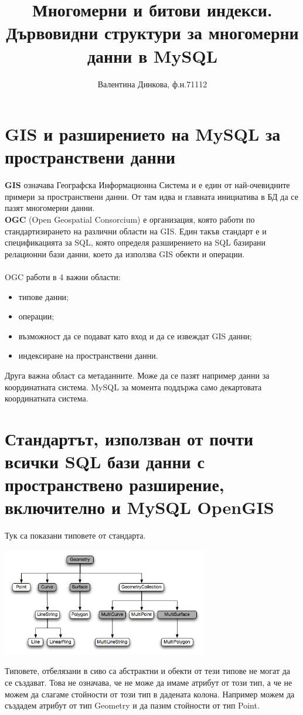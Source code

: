 \documentclass[a4paper,10pt]{article}
\title{Многомерни и битови индекси. Дървовидни структури за многомерни данни в MySQL}
\author{Валентина Динкова, ф.н.71112}
\begin{document}
\maketitle

\newpage
\section{GIS и разширението на MySQL за пространствени данни}
\textbf{GIS} означава Географска Информационна Система и е един от най-очевидните примери за пространствени данни.
От там идва и главната инициатива в БД да се пазят многомерни данни.
\\
\textbf{OGC} (Open Geospatial Consorcium) е организация, която работи по стандартизирането на различни области на GIS.
Един такъв стандарт е и спецификацията за SQL, която определя разширението на SQL базирани релационни бази данни,
 което да използва GIS обекти и операции.
\\
\\
 OGC работи в 4 важни области:
\begin{itemize}
 \item типове данни;
 \item операции;
 \item възможност да се подават като вход и да се извеждат GIS данни;
 \item индексиране на пространствени данни.
\end{itemize}
Друга важна област са метаданните. Може да се пазят например данни за координатната система. MySQL за момента поддържа само 
декартовата координатната система.
\\
\section{Стандартът, използван от почти всички SQL бази данни с пространствено разширение, включително и MySQL OpenGIS}
Тук са показани типовете от стандарта.
\begin{center}
\includegraphics[width=90mm]{gis-datatypes.png}\end{center}
Типовете, отбелязани в сиво са абстрактни и обекти от тези типове не могат да се създават. Това не означава, че не може да 
имаме атрибут от този тип, а че не можем да слагаме стойности от този тип в дадената колона. Например можем да 
създадем атрибут от тип Geometry и да пазим стойности от тип Point.
\end{document}
